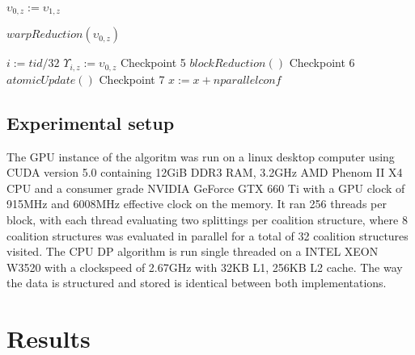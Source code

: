 \documentclass{aamas2012}
\begin{document}
\begin{algorithm}
\begin{algorithmic}[1]
      \STATE $\upsilon_{0,z} := \upsilon_{1,z}$
    \ENDIF
    
    \STATE $warpReduction(\upsilon_{0,z})$

      \STATE $i := tid / 32$
      \STATE $\Upsilon_{i,z} := \upsilon_{0,z}$
    \ENDIF
   \hfill Checkpoint 5
  \ENDFOR
  \STATE $blockReduction()$
  \hfill Checkpoint 6
  \STATE $atomicUpdate()$\label{lst:line:reductionend}
  \ENDIF
  \hfill Checkpoint 7
  \STATE $x := x + nparallelconf$
\ENDFOR
\end{algorithmic}
\end{algorithm}

\subsection{Experimental setup}

The GPU instance of the algoritm was run on a linux desktop computer using CUDA version 5.0 containing 12GiB DDR3 RAM, 
3.2GHz AMD Phenom II X4 CPU and a consumer grade NVIDIA GeForce GTX 660 Ti with a GPU clock of 915MHz and 6008MHz effective clock on the memory.
It ran 256 threads per block, with each thread evaluating two splittings per coalition structure, 
where 8 coalition structures was evaluated in parallel for a total of 32 coalition structures visited.
The CPU DP algorithm is run single threaded on a INTEL XEON W3520 with a clockspeed of 2.67GHz with 32KB L1, 256KB L2 cache. 
The way the data is structured and stored is identical between both implementations.
\section{Results}
\end{document}
